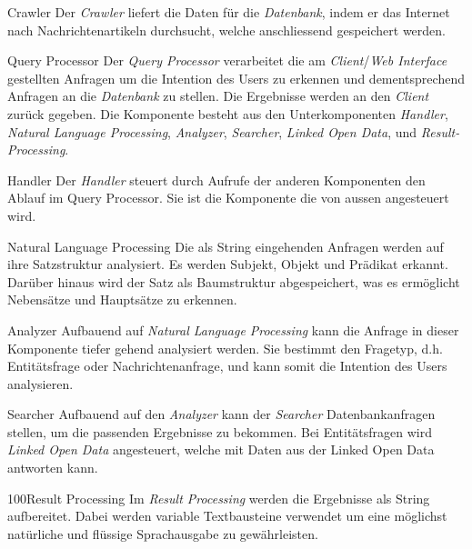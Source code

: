 \begin{component}{40}{Crawler}
Der \textit{Crawler} liefert die Daten für die \textit{Datenbank}, indem er das Internet nach Nachrichtenartikeln
durchsucht, welche anschliessend gespeichert werden.
\end{component}

\begin{component}{50}{Query Processor}
Der \textit{Query Processor} verarbeitet die am \textit{Client}/\textit{Web Interface} gestellten Anfragen um die Intention
des Users zu erkennen und dementsprechend Anfragen an die \textit{Datenbank} zu stellen. Die Ergebnisse
werden an den \textit{Client} zurück gegeben.
Die Komponente besteht aus den Unterkomponenten \textit{Handler}, \textit{Natural Language Processing}, \textit{Analyzer}, \textit{Searcher}, \textit{Linked Open Data}, und \textit{Result-Processing}.
\end{component}

\begin{component}{60}{Handler}
Der \textit{Handler} steuert durch Aufrufe der anderen Komponenten den Ablauf im Query Processor. Sie ist die Komponente die von aussen angesteuert wird. 
\end{component}

\begin{component}{70}{Natural Language Processing}
Die als String eingehenden Anfragen werden auf ihre Satzstruktur analysiert. Es werden Subjekt, Objekt und Prädikat erkannt.
Darüber hinaus wird der Satz als Baumstruktur abgespeichert, was es ermöglicht Nebensätze und Hauptsätze zu erkennen. 
\end{component}

\begin{component}{80}{Analyzer}
Aufbauend auf \textit{Natural Language Processing} kann die Anfrage in dieser Komponente tiefer gehend analysiert werden. Sie bestimmt den Fragetyp, d.h. Entitätsfrage oder Nachrichtenanfrage, und kann somit die Intention des Users analysieren. 
\end{component}

\begin{component}{90}{Searcher}
Aufbauend auf den \textit{Analyzer} kann der \textit{Searcher} Datenbankanfragen stellen, um die passenden Ergebnisse zu bekommen.
Bei Entitätsfragen wird \textit{Linked Open Data} angesteuert, welche mit Daten aus der Linked Open Data antworten kann. 
\end{component}

\begin{component}{100}{Result Processing}
Im \textit{Result Processing} werden die Ergebnisse als String aufbereitet. Dabei werden variable Textbausteine verwendet um eine möglichst natürliche und flüssige Sprachausgabe zu gewährleisten.
\end{component}


